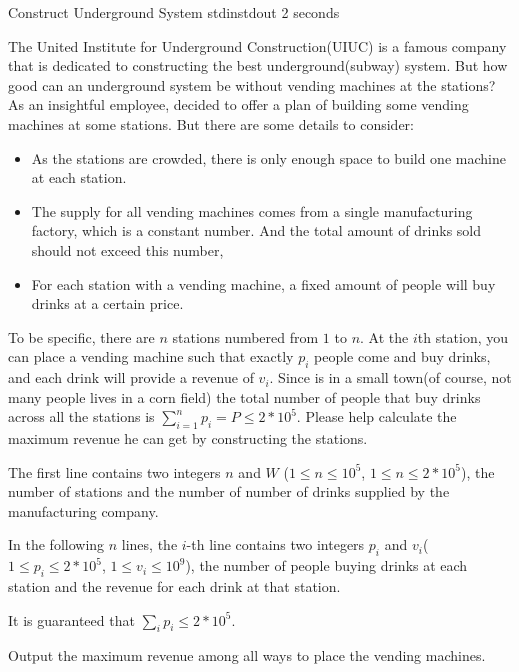 \begin{problem}{Construct Underground System}
{stdin}{stdout}
{2 seconds}{}{}

The United Institute for Underground Construction(UIUC) is a famous company that is dedicated to constructing the best underground(subway) system. But how good can an underground system be without vending machines at the stations? As an insightful employee, \pittoresque decided to offer a plan of building some vending machines at some stations. But there are some details to consider:
\begin{itemize}
    \item As the stations are crowded, there is only enough space to build one machine at each station.
    \item The supply for all vending machines comes from a single manufacturing factory, which is a constant number. And the total amount of drinks sold should not exceed this number,
    \item For each station with a vending machine, a fixed amount of people will buy drinks at a certain price. 
\end{itemize}

To be specific, there are $n$ stations numbered from $1$ to $n$. At the $i$th station, you can place a vending machine such that exactly $p_i$ people come and buy drinks, and each drink will provide a revenue of $v_i$. Since \pittoresque is in a small town(of course, not many people lives in a corn field) the total number of people that buy drinks across all the stations is $\sum_{i=1}^n p_i = P \leq 2 * 10^5$. Please help \pittoresque calculate the maximum revenue he can get by constructing the stations. 

\InputFile

The first line contains two integers $n$ and $W$ ($1 \le n \le 10^5$, $1 \le n \le 2 * 10^5$), the number of stations and the number of number of drinks supplied by the manufacturing company.

In the following $n$ lines, the $i$-th line contains two integers $p_i$ and $v_i$($1 \le p_i \le 2 * 10^5$, $1 \le v_i \le 10^9$), the number of people buying drinks at each station and the revenue for each drink at that station.

It is guaranteed that $\sum_i p_i \leq 2 * 10^5$.

\OutputFile

Output the maximum revenue among all ways to place the vending machines.

\Examples

\begin{example}
%
\end{example}

\begin{example}
%
\end{example}



\end{problem}